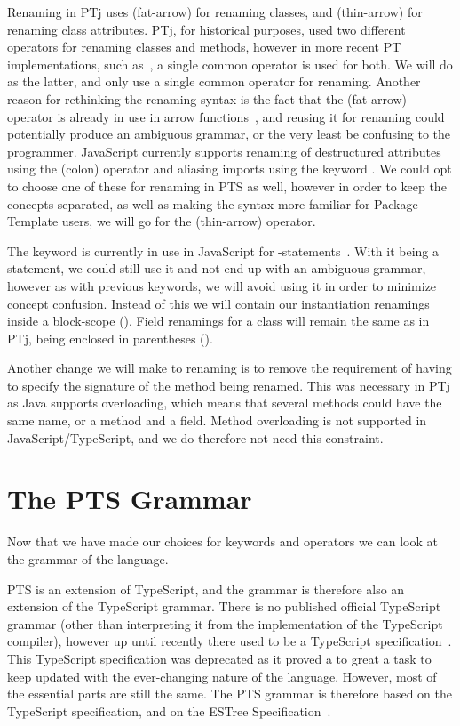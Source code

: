Renaming in PTj uses \codeword{=>}(fat-arrow) for renaming classes, and \codeword{->}(thin-arrow) for renaming class attributes.
PTj, for historical purposes, used two different operators for renaming classes and methods, however in more recent PT implementations, such as~\cite{Isene2018}, a single common operator is used for both.
We will do as the latter, and only use a single common operator for renaming.
Another reason for rethinking the renaming syntax is the fact that the \codeword{=>}(fat-arrow) operator is already in use in arrow functions~\cite{arrowfunction}, and reusing it for renaming could potentially produce an ambiguous grammar, or the very least be confusing to the programmer.
JavaScript currently supports renaming of destructured attributes using the \codeword{:}(colon) operator and aliasing imports using the keyword .
We could opt to choose one of these for renaming in PTS as well, however in order to keep the concepts separated, as well as making the syntax more familiar for Package Template users, we will go for the \codeword{->}(thin-arrow) operator.

The  keyword is currently in use in JavaScript for -statements~\cite{with-statement}.
With it being a statement, we could still use it and not end up with an ambiguous grammar, however as with previous keywords, we will avoid using it in order to minimize concept confusion.
Instead of this we will contain our instantiation renamings inside a block-scope (\codeword{\{ \}}).
Field renamings for a class will remain the same as in PTj, being enclosed in parentheses (\codeword{( )}).

Another change we will make to renaming is to remove the requirement of having to specify the signature of the method being renamed.
This was necessary in PTj as Java supports overloading, which means that several methods could have the same name, or a method and a field.
Method overloading is not supported in JavaScript/TypeScript, and we do therefore not need this constraint.

\section{The PTS Grammar}\label{sec:the-pts-grammar}

Now that we have made our choices for keywords and operators we can look at the grammar of the language.

PTS is an extension of TypeScript, and the grammar is therefore also an extension of the TypeScript grammar.
There is no published official TypeScript grammar (other than interpreting it from the implementation of the TypeScript compiler), however up until recently there used to be a TypeScript specification~\cite{tsspec}.
This TypeScript specification was deprecated as it proved a to great a task to keep updated with the ever-changing nature of the language.
However, most of the essential parts are still the same.
The PTS grammar is therefore based on the TypeScript specification, and on the ESTree Specification~\cite{estreespec}.

